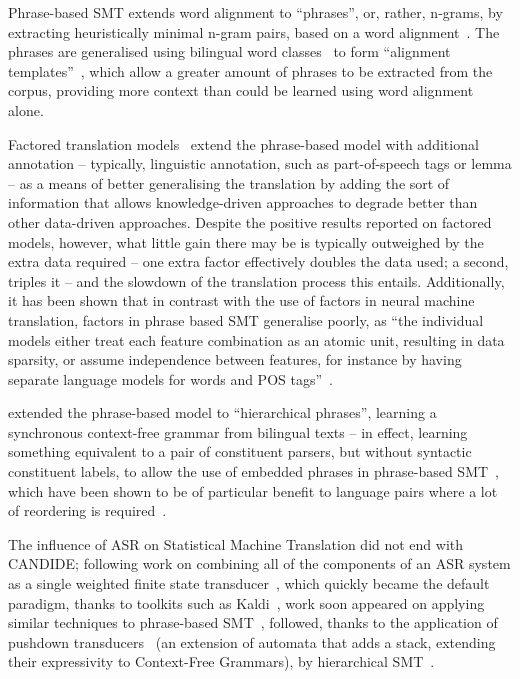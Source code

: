 Phrase-based SMT extends word alignment to ``phrases'', or, rather, n-grams, by extracting heuristically minimal n-gram 
pairs, based on a word alignment~\citep{och2004alignment}. The phrases are generalised using bilingual word 
classes~\citep{och1999wordclass} to form ``alignment templates''~\citep{och2004alignment}, which allow a greater
amount of phrases to be extracted from the corpus, providing more context than could be learned using word
alignment alone.

Factored translation models~\citep{koehn2007} extend the phrase-based model with additional annotation -- typically, 
linguistic annotation, such as part-of-speech tags or lemma -- as a means of better generalising the translation by
adding the sort of information that allows knowledge-driven approaches to degrade better than other data-driven
approaches. Despite the positive results reported on factored models, however, what little gain there may be is
typically outweighed by the extra data required -- one extra factor effectively doubles the data used; a second, 
triples it -- and the slowdown of the translation process this entails. Additionally, it has been shown that
in contrast with the use of factors in neural machine translation, factors in phrase based SMT generalise poorly, as
``the individual models either treat each feature combination
as an atomic unit, resulting in data sparsity, or assume 
independence between features, for instance
by having separate language models for words and
POS tags''~\cite[p. 89]{sennrich-haddow:2016:WMT}.

\citet{Chiang:2005:HPM:1219840.1219873} extended the phrase-based model to ``hierarchical phrases'', learning a
synchronous context-free grammar from bilingual texts -- in effect, learning something equivalent to a pair
of constituent parsers, but without syntactic constituent labels, to allow the use of embedded phrases in 
phrase-based SMT~\citep[e.g.,][]{Zollmann:2006:SAM:1654650.1654671}, which have been shown to be of particular
benefit to language pairs where a lot of reordering is required~\citep{Zollmann:2008:SCP:1599081.1599225}.

The influence of ASR on Statistical Machine Translation did not end with CANDIDE; following work on combining
all of the components of an ASR system as a single weighted finite state transducer~\citep{MOHRI200269}, which
quickly became the default paradigm, thanks to toolkits such as Kaldi~\citep{Povey_ASRU2011_2011}, work 
soon appeared on applying similar techniques to phrase-based SMT~\citep{Iglesias:2009:HPT:1620754.1620817},
followed, thanks to the application of pushdown transducers~\citep{Allauzen:2012:PTE:2402069.2402077} (an 
extension of automata that adds a stack, extending their expressivity to Context-Free Grammars), by 
hierarchical SMT~\citep{Iglesias:2011:HPT:2145432.2145577}.

